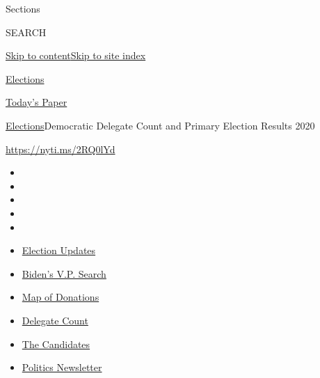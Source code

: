 Sections

SEARCH

\protect\hyperlink{site-content}{Skip to
content}\protect\hyperlink{site-index}{Skip to site index}

\href{https://www.nytimes.com/news-event/2020-election}{Elections}

\href{https://myaccount.nytimes.com/auth/login?response_type=cookie\&client_id=vi}{}

\href{https://www.nytimes.com/section/todayspaper}{Today's Paper}

\href{/news-event/2020-election}{Elections}\textbar{}Democratic Delegate
Count and Primary Election Results 2020

\url{https://nyti.ms/2RQ0lYd}

\begin{itemize}
\item
\item
\item
\item
\item
\end{itemize}

\begin{itemize}
\item
  \href{https://www.nytimes.com/2020/07/31/us/elections/biden-vs-trump.html?action=click\&pgtype=Article\&state=default\&region=TOP_BANNER\&context=storylines_menu}{Election
  Updates}
\item
  \href{https://www.nytimes.com/article/biden-vice-president-2020.html?action=click\&pgtype=Article\&state=default\&region=TOP_BANNER\&context=storylines_menu}{Biden's
  V.P. Search}
\item
  \href{https://www.nytimes.com/interactive/2020/07/24/us/politics/trump-biden-campaign-donors.html?action=click\&pgtype=Article\&state=default\&region=TOP_BANNER\&context=storylines_menu}{Map
  of Donations}
\item
  \href{https://www.nytimes.com/interactive/2020/us/elections/delegate-count-primary-results.html?action=click\&pgtype=Article\&state=default\&region=TOP_BANNER\&context=storylines_menu}{Delegate
  Count}
\item
  \href{https://www.nytimes.com/interactive/2019/us/politics/2020-presidential-candidates.html?action=click\&pgtype=Article\&state=default\&region=TOP_BANNER\&context=storylines_menu}{The
  Candidates}
\item
  \href{https://www.nytimes.com/newsletters/politics?action=click\&pgtype=Article\&state=default\&region=TOP_BANNER\&context=storylines_menu}{Politics
  Newsletter}
\end{itemize}

